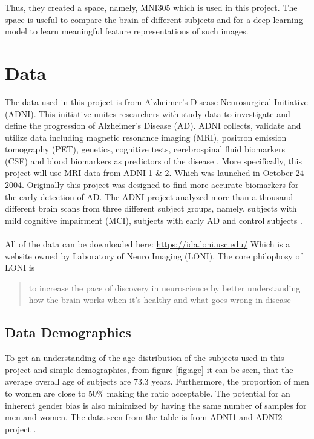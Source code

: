 \documentclass[12pt, fleqn, titlepage]{article}
\begin{document}
Thus, they created a space, namely, MNI305 which is used in this project. The space is useful to compare the brain of different subjects and for a deep learning model to learn meaningful feature representations of such images. 


\section{Data} 


The data used in this project is from Alzheimer's Disease Neurosurgical Initiative (ADNI). This initiative unites researchers with study data to investigate and define the progression of Alzheimer's Disease (AD). 
ADNI collects, validate and utilize data including magnetic resonance imaging (MRI), positron emission tomography (PET), genetics, cognitive tests, cerebrospinal fluid biomarkers (CSF) and blood biomarkers as predictors of the disease \cite{adni}.
More specifically, this project will use MRI data from ADNI 1 \& 2. 
Which was launched in October 24 2004. Originally this project was designed to find more accurate biomarkers for the early detection of AD.
The ADNI project analyzed more than a thousand different brain scans from three different subject groups, namely, subjects with mild cognitive impairment (MCI), subjects with early AD and control subjects \cite{adni1}. 
\\\\
All of the data can be downloaded here: \url{https://ida.loni.usc.edu/} \newline
Which is a website owned by Laboratory of Neuro Imaging (LONI). The core philophosy of LONI is \blockcquote{loni}{to increase the pace of discovery in neuroscience by better understanding how the brain works when it’s healthy and what goes wrong in disease}.


\subsection{Data Demographics}
To get an understanding of the age distribution of the subjects used in this project and simple demographics, from figure \ref{fig:age} it can be seen, that the average overall age of subjects are 73.3 years. Furthermore, the proportion of men to women are close to 50\% making the ratio acceptable. The  potential for an inherent gender bias is also minimized by having the same number of samples for men and women. The data seen from the table is from ADNI1 and ADNI2 project \cite{adni} \cite{adni1} .
\end{document}
